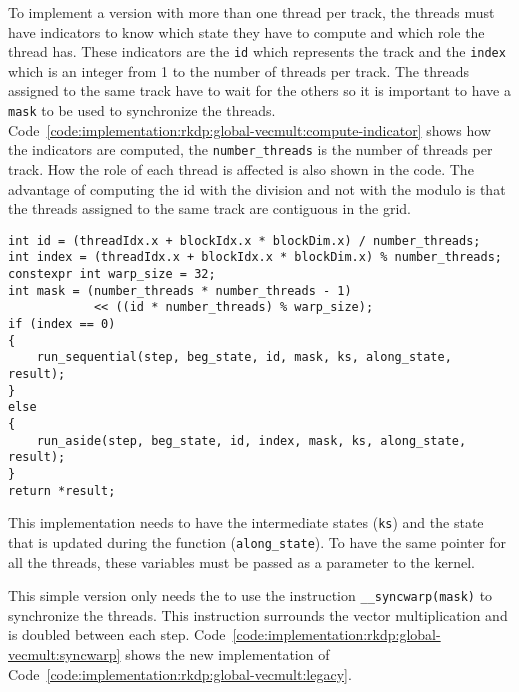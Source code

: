 To implement a version with more than one thread per track, the threads must
have indicators to know which state they have to compute and which role the
thread has. These indicators are the \texttt{id} which represents the track and
the \texttt{index} which is an integer from 1 to the number of threads per track.
The threads assigned to the same track have to wait for the others so it is
important to have a \texttt{mask} to be used to synchronize the threads.
Code~\ref{code:implementation:rkdp:global-vecmult:compute-indicator} shows how
the indicators are computed, the \texttt{number\_threads} is the number of
threads per track.
How the role of each thread is affected is also shown in the code.
The advantage of computing the id with the division and not with the modulo is
that the threads assigned to the same track are contiguous in the grid.

\begin{code}
    \label{code:implementation:rkdp:global-vecmult:compute-indicator}
    \begin{verbatim}
int id = (threadIdx.x + blockIdx.x * blockDim.x) / number_threads;
int index = (threadIdx.x + blockIdx.x * blockDim.x) % number_threads;
constexpr int warp_size = 32;
int mask = (number_threads * number_threads - 1)
            << ((id * number_threads) % warp_size);
if (index == 0)
{
    run_sequential(step, beg_state, id, mask, ks, along_state, result);
}
else
{
    run_aside(step, beg_state, id, index, mask, ks, along_state, result);
}
return *result;
    \end{verbatim}
\end{code}

This implementation needs to have the intermediate states (\texttt{ks}) and the
state that is updated during the function (\texttt{along\_state}).
To have the same pointer for all the threads, these variables must be passed
as a parameter to the kernel.

This simple version only needs the to use the instruction \texttt{\_\_syncwarp(mask)}
to synchronize the threads.
This instruction surrounds the vector multiplication and is doubled between each
step.
Code~\ref{code:implementation:rkdp:global-vecmult:syncwarp} shows the new
implementation of Code~\ref{code:implementation:rkdp:global-vecmult:legacy}.

